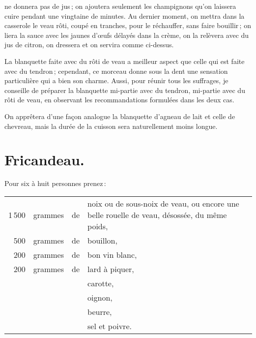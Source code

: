 ne donnera pas de jus ; on ajoutera seulement les champignons qu'on laissera
cuire pendant une vingtaine de minutes. Au dernier moment, on mettra dans la
casserole le veau rôti, coupé en tranches, pour le réchauffer, sans faire
bouillir ; on liera la sauce avec les jaunes d'œufs délayés dans la crème, on
la relèvera avec du jus de citron, on dressera et on servira comme ci-dessus.

\sk

La blanquette faite avec du rôti de veau a meilleur aspect que celle qui est
faite avec du tendron ; cependant, ce morceau donne sous la dent une sensation
particulière qui a bien son charme. Aussi, pour réunir tous les suffrages, je
conseille de préparer la blanquette mi-partie avec du tendron, mi-partie avec
du rôti de veau, en observant les recommandations formulées dans les deux cas.

\sk

On apprêtera d'une façon analogue la blanquette d'agneau de lait et celle de
chevreau, mais la durée de la cuisson sera naturellement moins longue.

\section*{\centering Fricandeau.}
{}

\label{pg0499} \hypertarget{p0499}{}

Pour six à huit personnes prenez :

\medskip

\footnotesize
\begin{longtable}{rrrp{18em}}
  1 500 & grammes & de & noix ou de sous-noix de veau, ou encore une belle
                         rouelle de veau, désossée, du même poids,                                        \\
    500 & grammes & de & bouillon,                                                                        \\
    200 & grammes & de & bon vin blanc,                                                                   \\
    200 & grammes & de & lard à piquer,                                                                   \\
        &         &    & carotte,                                                                         \\
        &         &    & oignon,                                                                          \\
        &         &    & beurre,                                                                          \\
        &         &    & sel et poivre.                                                                   \\
\end{longtable}
\normalsize

